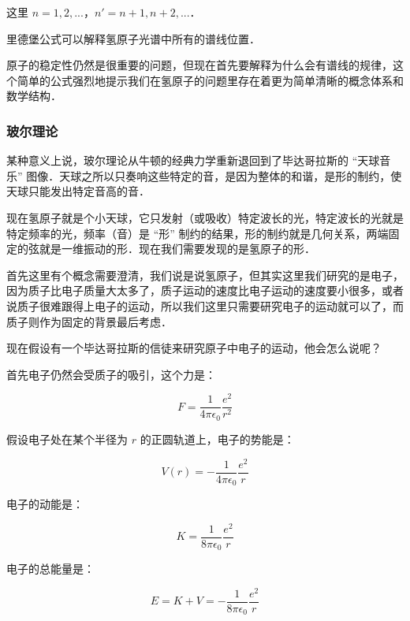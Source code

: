 这里 $n = 1,  2, ...$，$n' = n+1, n+2, ...$．

里德堡公式可以解释氢原子光谱中所有的谱线位置．

原子的稳定性仍然是很重要的问题，但现在首先要解释为什么会有谱线的规律，这个简单的公式强烈地提示我们在氢原子的问题里存在着更为简单清晰的概念体系和数学结构．

\subsubsection{玻尔理论}


某种意义上说，玻尔理论从牛顿的经典力学重新退回到了毕达哥拉斯的 “天球音乐” 图像．天球之所以只奏响这些特定的音，是因为整体的和谐，是形的制约，使天球只能发出特定音高的音．

现在氢原子就是个小天球，它只发射（或吸收）特定波长的光，特定波长的光就是特定频率的光，频率（音）是 “形” 制约的结果，形的制约就是几何关系，两端固定的弦就是一维振动的形．现在我们需要发现的是氢原子的形．

首先这里有个概念需要澄清，我们说是说氢原子，但其实这里我们研究的是电子，因为质子比电子质量大太多了，质子运动的速度比电子运动的速度要小很多，或者说质子很难跟得上电子的运动，所以我们这里只需要研究电子的运动就可以了，而质子则作为固定的背景最后考虑．

现在假设有一个毕达哥拉斯的信徒来研究原子中电子的运动，他会怎么说呢？

首先电子仍然会受质子的吸引，这个力是：

\begin{equation}
F = \frac{1}{4 \pi \epsilon_0} \frac{e^2}{ r^2 }
\end{equation}

假设电子处在某个半径为 $r$ 的正圆轨道上，电子的势能是：

\begin{equation}
V(r) = - \frac{1}{4 \pi \epsilon_0} \frac{e^2}{ r }
\end{equation}

电子的动能是：

\begin{equation}
K = \frac{1}{8 \pi \epsilon_0} \frac{e^2}{ r }
\end{equation}

电子的总能量是：

\begin{equation}
E = K + V = - \frac{1}{8 \pi \epsilon_0} \frac{e^2}{ r }
\end{equation}

